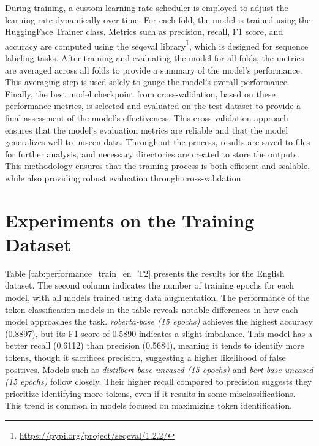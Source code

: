\documentclass{Configuration_Files/PoliMi3i_thesis}
\begin{document}
During training, a custom learning rate scheduler is employed to adjust the learning rate dynamically over time. For each fold, the model is trained using the HuggingFace Trainer class. Metrics such as precision, recall, F1 score, and accuracy are computed using the seqeval library\footnote{\url{https://pypi.org/project/seqeval/1.2.2/}}, which is designed for sequence labeling tasks. After training and evaluating the model for all folds, the metrics are averaged across all folds to provide a summary of the model’s performance. This averaging step is used solely to gauge the model's overall performance. Finally, the best model checkpoint from cross-validation, based on these performance metrics, is selected and evaluated on the test dataset to provide a final assessment of the model's effectiveness.  This cross-validation approach ensures that the model's evaluation metrics are reliable and that the model generalizes well to unseen data. Throughout the process, results are saved to files for further analysis, and necessary directories are created to store the outputs. This methodology ensures that the training process is both efficient and scalable, while also providing robust evaluation through cross-validation. 

\section{Experiments on the Training Dataset} \label{sec:experiments_train_dataset_T2}

Table \ref{tab:performance_train_en_T2} presents the results for the English dataset. The second column indicates the number of training epochs for each model, with all models trained using data augmentation. The performance of the token classification models in the table reveals notable differences in how each model approaches the task. \textit{roberta-base (15 epochs)} achieves the highest accuracy (0.8897), but its F1 score of 0.5890 indicates a slight imbalance. This model has a better recall (0.6112) than precision (0.5684), meaning it tends to identify more tokens, though it sacrifices precision, suggesting a higher likelihood of false positives. Models such as \textit{distilbert-base-uncased (15 epochs)} and \textit{bert-base-uncased (15 epochs)} follow closely. Their higher recall compared to precision suggests they prioritize identifying more tokens, even if it results in some misclassifications. This trend is common in models focused on maximizing token identification.
\end{document}
